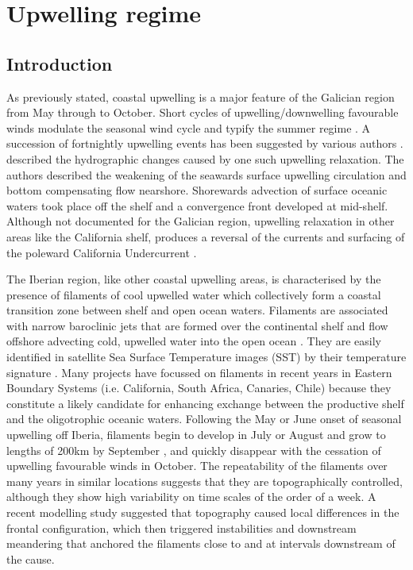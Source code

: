 
\chapter{Upwelling regime}\label{ch:summer}
\section{Introduction}
As previously stated, coastal upwelling is a major feature of the
Galician region from May through to October. Short cycles of
upwelling/downwelling favourable winds modulate the seasonal wind
cycle and typify the summer regime \citep{Nogueira98}. A
 succession of fortnightly upwelling events has been suggested by
various authors \citep[][ see also
Chapter~\ref{ch:winds}]{Castro94,Mcclain86,Nogueira97}.
\citet{Castro94} described the hydrographic changes caused by one
such upwelling relaxation. The authors described the weakening of
the seawards surface upwelling circulation and bottom compensating
flow nearshore. Shorewards advection of surface oceanic waters
took place off the shelf and a convergence front developed at
mid-shelf. Although not documented for the Galician region,
upwelling relaxation in other areas like the California shelf,
produces a reversal of the currents and surfacing of the poleward
California Undercurrent \citep{Send87}.

The Iberian region, like other coastal upwelling areas, is
characterised by the presence of filaments of cool upwelled water
which collectively form a coastal transition zone between shelf
and open ocean waters. Filaments are associated with narrow
baroclinic jets that are formed over the continental shelf and
flow offshore advecting cold, upwelled water into the open ocean
\citep{Brink91c}. They are easily identified in satellite Sea
Surface Temperature images (SST) by their temperature signature
\citep{Flament85}. Many projects have focussed on filaments in
recent years in Eastern Boundary Systems (i.e. California, South
Africa, Canaries, Chile) because they constitute a likely
candidate for enhancing exchange between the productive shelf and
the oligotrophic oceanic waters. Following the May or June onset
of seasonal upwelling off Iberia, filaments begin to develop in
July or August and grow to lengths of 200km by September
\citep{Haynes93}, and quickly disappear with the cessation of
upwelling favourable winds in October. The repeatability of the
filaments over many years in similar locations suggests that they
are topographically controlled, although they show high
variability on time scales of the order of a week. A recent
modelling study \citep{Roed99} suggested that topography caused
local differences in the frontal configuration, which then
triggered instabilities and downstream meandering that anchored
the filaments close to and at intervals downstream of the cause.


